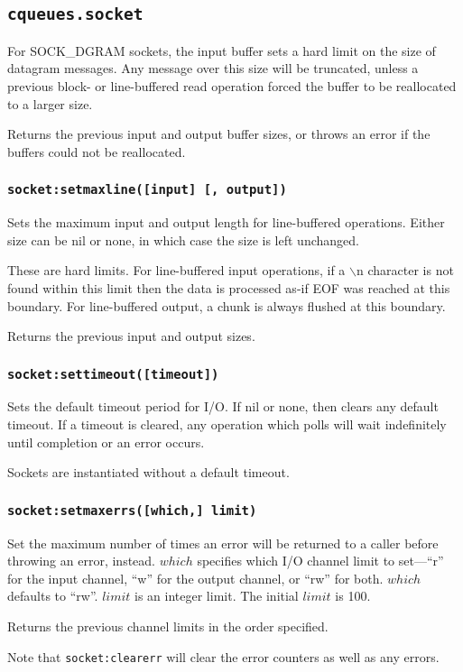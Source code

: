 \documentclass[11pt, oneside]{memoir}
\newcommand*{\fn}[1]{\texttt{#1}\xspace}
\newcommand*{\lf}[0]{$\backslash$n\xspace}
\newcounter{toccols}
\newenvironment{Module}[1]{
	\subsection{\texttt{#1}}
	\addtocontents{toc}{
		\protect\begin{multicols}{\value{toccols}}
	}
}{
	\addtocontents{toc}{\protect\end{multicols}}
}
\begin{document}
\begin{Module}{cqueues.socket}
For SOCK\_DGRAM sockets, the input buffer sets a hard limit on the size of datagram messages. Any message over this size will be truncated, unless a previous block- or line-buffered read operation forced the buffer to be reallocated to a larger size.

Returns the previous input and output buffer sizes, or throws an error if the buffers could not be reallocated.

\subsubsection[\fn{socket:setmaxline}]{\fn{socket:setmaxline([input] [, output])}}
Sets the maximum input and output length for line-buffered operations. Either size can be nil or none, in which case the size is left unchanged.

These are hard limits. For line-buffered input operations, if a \lf character is not found within this limit then the data is processed as-if EOF was reached at this boundary. For line-buffered output, a chunk is always flushed at this boundary.

Returns the previous input and output sizes.

\subsubsection[\fn{socket:settimeout}]{\fn{socket:settimeout([timeout])}}

Sets the default timeout period for I/O. If nil or none, then clears any default timeout. If a timeout is cleared, any operation which polls will wait indefinitely until completion or an error occurs.

Sockets are instantiated without a default timeout.

\subsubsection[\fn{socket:setmaxerrs}]{\fn{socket:setmaxerrs([which,] limit)}}

Set the maximum number of times an error will be returned to a caller before throwing an error, instead. $which$ specifies which I/O channel limit to set---``r'' for the input channel, ``w'' for the output channel, or ``rw'' for both. $which$ defaults to ``rw''. $limit$ is an integer limit. The initial $limit$ is 100.

Returns the previous channel limits in the order specified.

Note that \fn{socket:clearerr} will clear the error counters as well as any errors.


\end{Module}
\end{document}
